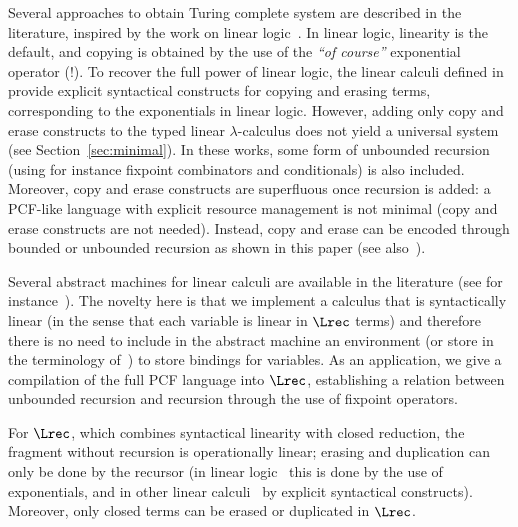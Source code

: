 \documentclass{article}
\begin{document}
Several approaches to obtain Turing complete system are described in
the literature, inspired by the work on linear
logic~\cite{GirardJY:linl}. In linear logic, linearity is the default,
and copying is obtained by the use of the \emph{``of course''}
exponential operator (!). To recover the full power of linear logic,
the linear calculi defined
in~\cite{AbramskyS:comill,MackieIC:lilfpl,HolmstromS:linfp} provide
explicit syntactical constructs for copying and erasing terms,
corresponding to the exponentials in linear logic.  However, adding
only copy and erase constructs to the typed linear $\lambda$-calculus
does not yield a universal system (see Section~\ref{sec:minimal}). In these works, some form of
unbounded recursion (using for instance fixpoint combinators and
conditionals) is also included.  Moreover, copy and erase constructs
are superfluous once recursion is added: a PCF-like language with
explicit resource management is not minimal (copy and erase constructs
are not needed).  Instead, copy and erase can be encoded through bounded or unbounded
recursion as shown in this paper (see also~\cite{MillerD:leagfp,AlvesS:phd,MackieIC:linearT}).


Several abstract machines for linear calculi are available in the
literature (see for
instance~\cite{MackieIC:geoim,David_WalkerChapter,LafontY:linam}). The
novelty here is that we implement a calculus that is syntactically
linear (in the sense that each variable is linear in $\Lrec$ terms)
and therefore there is no need to include in the abstract machine an
environment (or store in the terminology
of~\cite{David_WalkerChapter}) to store bindings for variables.  As an
application, we give a compilation of the full PCF language into
$\Lrec$, establishing a relation between unbounded recursion and
recursion through the use of fixpoint operators. 


 For $\Lrec$, which
combines syntactical linearity with closed reduction, the fragment
without recursion is operationally linear; erasing and duplication can
only be done by the recursor (in linear logic~\cite{GirardJY:linl}
this is done by the use of exponentials, and in other linear
calculi~\cite{AbramskyS:comill,MackieIC:lilfpl,HolmstromS:linfp,David_WalkerChapter}
by explicit syntactical constructs). Moreover, only closed terms can
be erased or duplicated in $\Lrec$.
\end{document}
